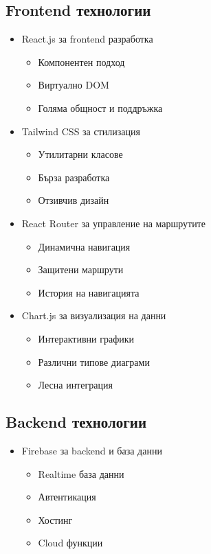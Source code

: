 \documentclass[12pt,a4paper]{article}
\begin{document}
\subsection{Frontend технологии}
\begin{itemize}
    \item React.js за frontend разработка
    \begin{itemize}
        \item Компонентен подход
        \item Виртуално DOM
        \item Голяма общност и поддръжка
    \end{itemize}
    
    \item Tailwind CSS за стилизация
    \begin{itemize}
        \item Утилитарни класове
        \item Бърза разработка
        \item Отзивчив дизайн
    \end{itemize}
    
    \item React Router за управление на маршрутите
    \begin{itemize}
        \item Динамична навигация
        \item Защитени маршрути
        \item История на навигацията
    \end{itemize}
    
    \item Chart.js за визуализация на данни
    \begin{itemize}
        \item Интерактивни графики
        \item Различни типове диаграми
        \item Лесна интеграция
    \end{itemize}
\end{itemize}

\subsection{Backend технологии}
\begin{itemize}
    \item Firebase за backend и база данни
    \begin{itemize}
        \item Realtime база данни
        \item Автентикация
        \item Хостинг
        \item Cloud функции
    \end{itemize}
\end{itemize}
\end{document}
